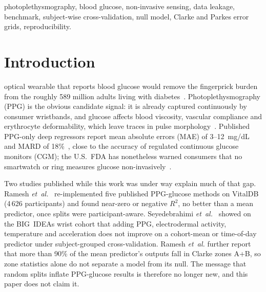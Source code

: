 \documentclass[journal]{IEEEtran}
\begin{document}
\begin{IEEEkeywords}
photoplethysmography, blood glucose, non-invasive sensing, data leakage,
benchmark, subject-wise cross-validation, null model, Clarke and Parkes error
grids, reproducibility.
\end{IEEEkeywords}

\section{Introduction}
\label{sec:intro}

 optical wearable that reports blood glucose would remove
the fingerprick burden from the roughly 589 million adults living with
diabetes~\cite{idf2025}.  Photoplethysmography (PPG) is the obvious candidate
signal: it is already captured continuously by consumer wristbands, and
glucose affects blood viscosity, vascular compliance and erythrocyte
deformability, which leave traces in pulse morphology~\cite{allen2007ppg}.
Published PPG-only deep regressors report mean absolute errors (MAE) of
3--12~mg/dL~\cite{soliman2024,syamsul2026,chen2024mvcft} and MARD of
18\%~\cite{ali2025jbhi}, close to the accuracy of regulated continuous
glucose monitors (CGM); the U.S.\ FDA
has nonetheless warned consumers that no smartwatch or ring measures glucose
non-invasively~\cite{fda2024}.

Two studies published while this work was under way explain much of that
gap.  Ramesh \emph{et~al.}~\cite{ramesh2026} re-implemented five published
PPG-glucose methods on VitalDB (4\,626 participants) and found near-zero or
negative $R^2$, no better than a mean predictor, once splits were
participant-aware.  Seyedebrahimi \emph{et~al.}~\cite{seyedebrahimi2026}
showed on the BIG~IDEAs wrist cohort that adding PPG, electrodermal activity,
temperature and acceleration does not improve on a cohort-mean or
time-of-day predictor under subject-grouped cross-validation.  Ramesh
\emph{et~al.} further report that more than 90\% of the mean predictor's
outputs fall in Clarke zones A+B, so zone statistics alone do not separate
a model from its null.  The message that random splits inflate PPG-glucose results is therefore no
longer new, and this paper does not claim it.
\end{document}
